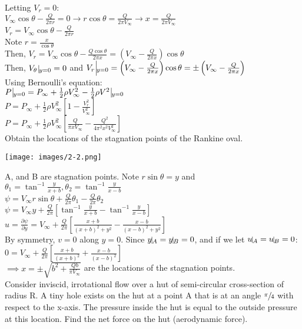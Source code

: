 \documentclass[12pt, twocolumn, letterpaper]{article}
\begin{document}
Letting $V_r=0$:\\
$V_\infty\cos\theta-\frac{Q}{2\pi r}=0 \to r\cos\theta=\frac{Q}{2\pi V_\infty} \to x=\frac{Q}{2\pi V_\infty}$\\
$V_r=V_\infty\cos\theta-\frac{Q}{2\pi r}$\\
Note $r=\frac{x}{\cos\theta}$\\
Then, $V_r=V_\infty\cos\theta-\frac{Q\cos\theta}{2\pi x}=\left(V_\infty-\frac{Q}{2\pi x}\right)\cos\theta$\\
Then, $V_\theta\,\vline_{y=0}=0$ and $V_r\,\vline_{y=0}=\left(V_\infty-\frac{Q}{2\pi x}\right)\cos\theta=\pm\left(V_\infty-\frac{Q}{2\pi x}\right)$\\
Using Bernoulli's equation:\\
$P\,\vline_{y=0}=P_\infty+\frac{1}{2}\rho V_\infty^2-\frac{1}{2}\rho V^2\,\vline_{y=0}$\\
$P=P_\infty+\frac{1}{2}\rho V_\infty^2\left[1-\frac{V_r^2}{V_\infty^2}\right]$\\
$P=P_\infty+\frac{1}{2}\rho V_\infty^2\left[\frac{Q}{\pi x V_\infty}-\frac{Q^2}{4\pi^2x^2V_\infty^2}\right]$\\
\hline
Obtain the locations of the stagnation points of the Rankine oval.
\begin{center}
    \texttt{[image: images/2-2.png]}
\end{center}
A, and B are stagnation points. Note $r\sin\theta=y$ and $\theta_1=\tan^{-1}\frac{y}{x+b},\theta_2=\tan^{-1}\frac{y}{x-b}$\\
$\psi=V_\infty r\sin\theta+\frac{Q}{2\pi}\theta_1-\frac{Q}{2\pi}\theta_2$\\
$\psi=V_\infty y + \frac{Q}{2\pi}\left[\tan^{-1}\frac{y}{x+b}-\tan^{-1}\frac{y}{x-b}\right]$\\
$u=\frac{\partial \psi}{\partial y}=V_\infty+\frac{Q}{2\pi}\left[\frac{x+b}{(x+b)^2+y^2}-\frac{x-b}{(x-b)^2+y^2}\right]$\\
By symmetry, $v=0$ along $y=0$. Since $y\vline_A=y\vline_B=0$, and if we let $u\vline_A=u\vline_B=0$:\\
$0=V_\infty+\frac{Q}{2\pi}\left[\frac{x+b}{(x+b)^2}+\frac{x-b}{(x-b)^2}\right]$\\
$\implies x=\pm\sqrt{b^2+\frac{Qb}{\pi V_\infty}}$ are the locations of the stagnation points.\\
\hline
Consider inviscid, irrotational flow over a hut of semi-circular cross-section of radius R. A tiny hole exists on the hut at a point A that is at an angle $\sfrac{\pi}{4}$ with respect to the x-axis. The pressure inside the hut is equal to the outside pressure at this location. Find the net force on the hut (aerodynamic force).
\end{document}
